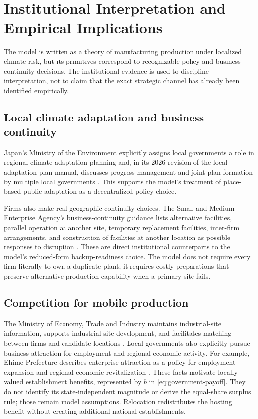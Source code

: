 \section{Institutional Interpretation and Empirical Implications}\label{sec:institutions}

The model is written as a theory of manufacturing production under localized climate risk, but its primitives correspond to recognizable policy and business-continuity decisions. The institutional evidence is used to discipline interpretation, not to claim that the exact strategic channel has already been identified empirically.

\subsection{Local climate adaptation and business continuity}

Japan's Ministry of the Environment explicitly assigns local governments a role in regional climate-adaptation planning and, in its 2026 revision of the local adaptation-plan manual, discusses progress management and joint plan formation by multiple local governments \citep{MOE2026}. This supports the model's treatment of place-based public adaptation as a decentralized policy choice.

Firms also make real geographic continuity choices. The Small and Medium Enterprise Agency's business-continuity guidance lists alternative facilities, parallel operation at another site, temporary replacement facilities, inter-firm arrangements, and construction of facilities at another location as possible responses to disruption \citep{SMEA_BCP}. These are direct institutional counterparts to the model's reduced-form backup-readiness choice. The model does not require every firm literally to own a duplicate plant; it requires costly preparations that preserve alternative production capability when a primary site fails.

\subsection{Competition for mobile production}

The Ministry of Economy, Trade and Industry maintains industrial-site information, supports industrial-site development, and facilitates matching between firms and candidate locations \citep{METI2026}. Local governments also explicitly pursue business attraction for employment and regional economic activity. For example, Ehime Prefecture describes enterprise attraction as a policy for employment expansion and regional economic revitalization \citep{EHIME2026}. These facts motivate locally valued establishment benefits, represented by $b$ in \eqref{eq:government-payoff}. They do not identify its state-independent magnitude or derive the equal-share surplus rule; those remain model assumptions. Relocation redistributes the hosting benefit without creating additional national establishments.

